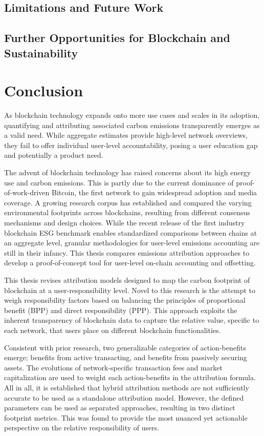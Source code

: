 \documentclass[11pt]{report}
\begin{document}
\newpage


\section{Limitations and Future Work} \label{se:limitations}
\section{Further Opportunities for Blockchain and Sustainability}

\chapter{Conclusion}

As blockchain technology expands onto more use cases and scales in its adoption, quantifying and attributing associated carbon emissions transparently emerges as a valid need. While aggregate estimates provide high-level network overviews, they fail to offer individual user-level accountability, posing a user education gap and potentially a product need.

The advent of blockchain technology has raised concerns about its high energy use and carbon emissions. This is partly due to the current dominance of proof-of-work-driven Bitcoin, the first network to gain widespread adoption and media coverage. A growing research corpus has established and compared the varying environmental footprints across blockchains, resulting from different consensus mechanisms and design choices. While the recent release of the first industry blockchain ESG benchmark enables standardized comparisons between chains at an aggregate level, granular methodologies for user-level emissions accounting are still in their infancy. This thesis compares emissions attribution approaches to develop a proof-of-concept tool for user-level on-chain accounting and offsetting.

This thesis revises attribution models designed to map the carbon footprint of blockchain at a user-responsibility level. Novel to this research is the attempt to weigh responsibility factors based on balancing the principles of proportional benefit (\ac{BPP}) and direct responsibility (\ac{PPP}). This approach exploits the inherent transparency of blockchain data to capture the relative value, specific to each network, that users place on different blockchain functionalities.

Consistent with prior research, two generalizable categories of action-benefits emerge;  benefits from active transacting, and benefits from passively securing assets. The evolutions of network-specific transaction fees and market capitalization are used to weight each action-benefits in the attribution formula. All in all, it is established that hybrid attribution methods are not sufficiently accurate to be used as a standalone attribution model. However, the defined parameters can be used as separated approaches, resulting in two distinct footprint metrics. This was found to provide the most nuanced yet actionable perspective on the relative responsibility of users.
\end{document}
